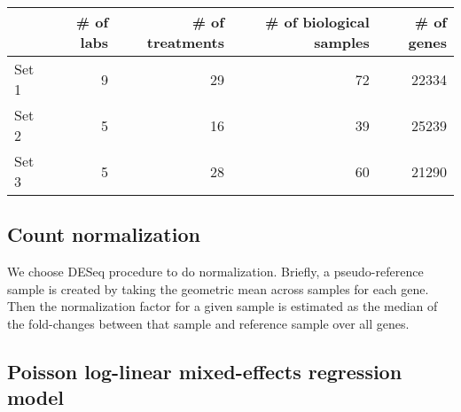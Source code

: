 \documentclass[11pt, a4paper]{article}
\begin{document}
\begin{table}[h]
\centering
\begin{tabular}{lrrrr} \hline
& \# of labs & \# of treatments  & \# of biological samples & \# of genes \\ \hline
Set 1 &9 & 29 &72  &22334  \\
Set 2 &5 & 16 & 39 &25239  \\
Set 3 &5 &28  &60  & 21290\\ \hline
\end{tabular}
\end{table}


\subsection{Count normalization}\label{countNormalization}
We choose DESeq  procedure \citep{anders2010differential} to do normalization.  Briefly, a pseudo-reference sample is created by taking the geometric mean across samples for each gene. Then the normalization factor for a given sample is estimated as the median of the fold-changes between that sample and reference sample over all genes.

\subsection{Poisson log-linear mixed-effects regression model} 
\end{document}
